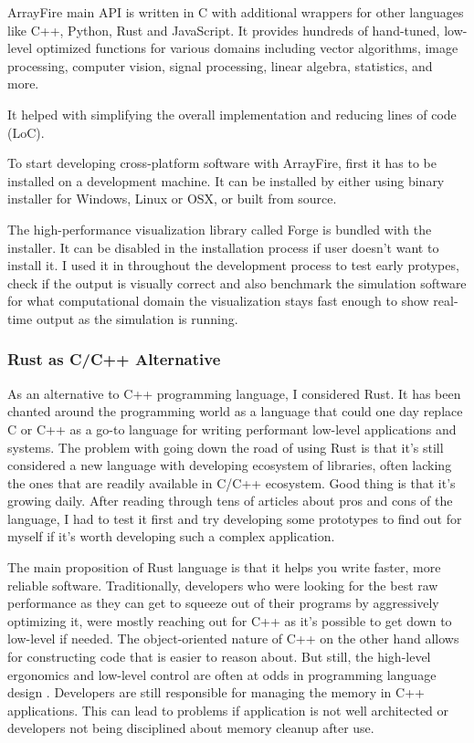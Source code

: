 ArrayFire main API is written in C with additional wrappers for other languages like C++, Python, Rust and JavaScript. It provides hundreds of hand-tuned, low-level optimized functions for various domains including vector algorithms, image processing, computer vision, signal processing, linear algebra, statistics, and more.

It helped with simplifying the overall implementation and reducing lines of code (LoC).

To start developing cross-platform software with ArrayFire, first it has to be installed on a development machine. It can be installed by either using binary installer for Windows, Linux or OSX, or built from source.

The high-performance visualization library called Forge is bundled with the installer. It can be disabled in the installation process if user doesn't want to install it. I used it in throughout the development process to test early protypes, check if the output is visually correct and also benchmark the simulation software for what computational domain the visualization stays fast enough to show real-time output as the simulation is running.



\subsubsection{Rust as C/C++ Alternative} \label{sec:rust-alt}
As an alternative to C++ programming language, I considered Rust. It has been chanted around the programming world as a language that could one day replace C or C++ as a go-to language for writing performant low-level applications and systems. The problem with going down the road of using Rust is that it's still considered a new language with developing ecosystem of libraries, often lacking the ones that are readily available in C/C++ ecosystem. Good thing is that it's growing daily. After reading through tens of articles about pros and cons of the language, I had to test it first and try developing some prototypes to find out for myself if it's worth developing such a complex application.

The main proposition of Rust language is that it helps you write faster, more reliable software. Traditionally, developers who were looking for the best raw performance as they can get to squeeze out of their programs by aggressively optimizing it, were mostly reaching out for C++ as it's possible to get down to low-level if needed. The object-oriented nature of C++ on the other hand allows for constructing code that is easier to reason about. But still, the high-level ergonomics and low-level control are often at odds in programming language design \citep{steveklabnik2018}. Developers are still responsible for managing the memory in C++ applications. This can lead to problems if application is not well architected or developers not being disciplined about memory cleanup after use.

